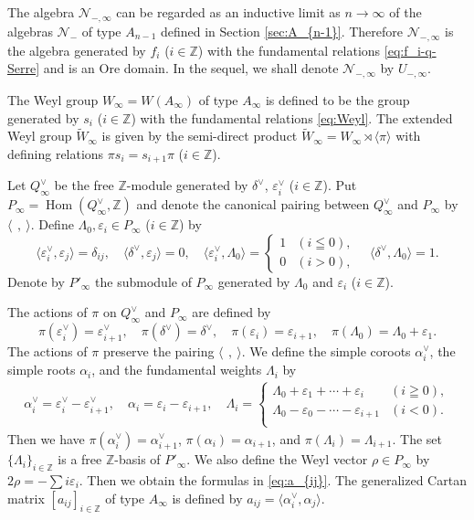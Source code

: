 \documentclass[12pt,twoside]{article}
\newcommand\N{{\mathcal N}}
\newcommand\tW{{\widetilde W}}
\newcommand\av{\alpha^\vee}
\newcommand\eps{\varepsilon}
\newcommand\epsv{\eps^\vee}
\newcommand\deltav{\delta^\vee}
\newcommand\Qv{Q^\vee}
\newcommand\bra{\langle}
\newcommand\ket{\rangle}
\newcommand\Hom{\mathop{\mathrm{Hom}}\nolimits}
\newcommand\Z{{\mathbb Z}} %
\theoremstyle{plain} %
\theoremstyle{definition} %
\theoremstyle{definition} %
\numberwithin{theorem}{section}
\numberwithin{equation}{section}
\numberwithin{figure}{section}
\numberwithin{table}{section}
\newcommand\secref[1]{Section \ref{#1}}
\begin{document}
The algebra $\N_{-,\infty}$ can be regarded as an inductive limit 
as $n\to\infty$ of the algebras $\N_-$ of type $A_{n-1}$ 
defined in \secref{sec:A_{n-1}}.
Therefore $\N_{-,\infty}$ is the algebra generated by $f_i$ ($i\in\Z$)
with the fundamental relations \eqref{eq:f_i-q-Serre}
and is an Ore domain.
In the sequel, we shall denote $\N_{-,\infty}$ by $U_{-,\infty}$.

The Weyl group $W_\infty=W(A_\infty)$ of type $A_\infty$ 
is defined to be the group generated by $s_i$ ($i\in\Z$) 
with the fundamental relations \eqref{eq:Weyl}.
The extended Weyl group $\tW_\infty$ is given by
the semi-direct product $\tW_\infty=W_\infty\rtimes\bra\pi\ket$ with
defining relations $\pi s_i = s_{i+1}\pi$ ($i\in\Z$).

Let $\Qv_\infty$ be the free $\Z$-module generated 
by $\deltav$, $\epsv_i$ ($i\in\Z$).
Put $P_\infty=\Hom(\Qv_\infty,\Z)$
and denote the canonical pairing 
between $\Qv_\infty$ and $P_\infty$ by $\bra\,\ ,\ \ket$.
Define $\Lambda_0,\eps_i\in P_\infty$ ($i\in\Z$) by
\begin{equation*}
 \bra\epsv_i,\eps_j\ket = \delta_{ij}, \quad
 \bra\deltav,\eps_j\ket = 0, \quad
 \bra\epsv_i,\Lambda_0\ket = 
 \begin{cases}
  1 & (i\leqq 0), \\
  0 & (i>0),
 \end{cases}
 \quad
 \bra\deltav,\Lambda_0\ket = 1.
\end{equation*}
Denote by $P'_\infty$ the submodule of $P_\infty$ 
generated by $\Lambda_0$ and $\eps_i$ ($i\in\Z$).

The actions of $\pi$ on $\Qv_\infty$ and $P_\infty$ are defined by
\begin{equation*}
 \pi(\epsv_i) = \epsv_{i+1}, \quad
 \pi(\deltav) = \deltav, \quad
 \pi(\eps_i) = \eps_{i+1}, \quad
 \pi(\Lambda_0) = \Lambda_0+\eps_1.
\end{equation*}
The actions of $\pi$ preserve the pairing $\bra\,\ ,\ \ket$.
We define the simple coroots $\av_i$, 
the simple roots $\alpha_i$, 
and the fundamental weights $\Lambda_i$ by 
\begin{align*}
 \av_i = \epsv_i-\epsv_{i+1}, \quad
 \alpha_i = \eps_i - \eps_{i+1},
 \quad
 \Lambda_i = 
 \begin{cases}
  \Lambda_0 + \eps_1 + \cdots + \eps_i     & (i\geqq 0), \\
  \Lambda_0 - \eps_0 - \cdots - \eps_{i+1} & (i<0). \\
 \end{cases}
\end{align*}
Then we have $\pi(\av_i)=\av_{i+1}$, $\pi(\alpha_i)=\alpha_{i+1}$,
and $\pi(\Lambda_i)=\Lambda_{i+1}$.
The set $\{\Lambda_i\}_{i\in\Z}$ is a free $\Z$-basis of $P'_\infty$.
We also define the Weyl vector $\rho\in P_\infty$ 
by $2\rho = - \sum i \eps_i$.
Then we obtain the formulas in \eqref{eq:a_{ij}}.
The generalized Cartan matrix $[a_{ij}]_{i\in\Z}$ of type $A_\infty$
is defined by $a_{ij}=\bra\av_i,\alpha_j\ket$.
\end{document}
